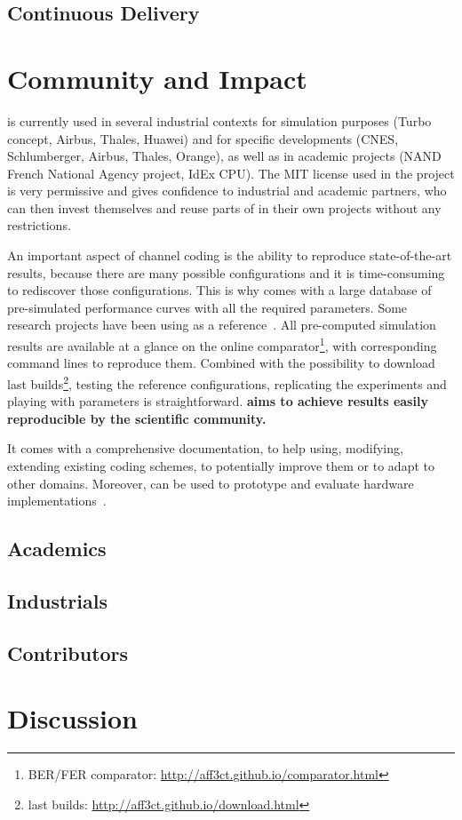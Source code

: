 \subsection{Continuous Delivery}

\section{Community and Impact}

\AFFECT is currently used in several industrial contexts for simulation purposes
(Turbo concept, Airbus, Thales, Huawei) and for specific developments (CNES,
Schlumberger, Airbus, Thales, Orange), as well as in academic projects (NAND
French National Agency project, IdEx CPU). The MIT license used in the project
is very permissive and gives confidence to industrial and academic partners, who
can then invest themselves and reuse parts of \AFFECT in their own projects
without any restrictions.

An important aspect of channel coding is the ability to reproduce
state-of-the-art results, because there are many possible configurations and it
is time-consuming to rediscover those configurations. This is why \AFFECT comes
with a large database of pre-simulated performance curves with all the required
parameters. Some research projects have been using \AFFECT as a
reference~\cite{Leonardon2018a,Leonardon2018b,Florian2018,Pignoly2018,
Ghanaatian2018,Poulenard2018,Cavatassi2019a,Cavatassi2019b,Cenova2019,
Guermouche2019,Krainyk2019,Wang2019,Wang2019a,Hsieh2020,Rush2020,Tasdighi2020}.
All pre-computed simulation results are available at a glance on the online
comparator\footnote{BER/FER comparator:
\url{http://aff3ct.github.io/comparator.html}}, with corresponding command lines
to reproduce them. Combined with the possibility to download \AFFECT last
builds\footnote{\AFFECT last builds:
\url{http://aff3ct.github.io/download.html}}, testing the reference
configurations, replicating the experiments and playing with parameters is
straightforward. \textbf{\AFFECT aims to achieve results easily reproducible by
the scientific community.}

It comes with a comprehensive documentation, to help using, modifying, extending
existing coding schemes, to potentially improve them or to adapt to other
domains. Moreover, \AFFECT can be used to prototype and evaluate hardware
implementations~\cite{Cassagne2017a}.

\subsection{Academics}
\subsection{Industrials}
\subsection{Contributors}

\section{Discussion}
